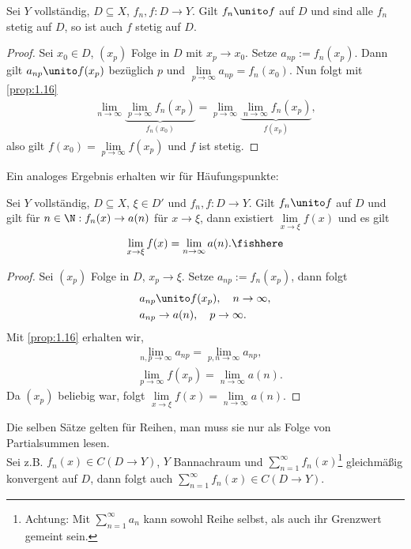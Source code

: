 \begin{prop}
\label{prop:1.21}
Sei $Y$ vollständig, $D\subseteq X$, $f_n,f: D\to Y$. Gilt $f_n\unito f$ auf
$D$ und sind alle $f_n$ stetig auf $D$, so ist auch $f$ stetig auf $D$.\fishhere
\end{prop}
\begin{proof}
Sei $x_0\in D$, $(x_p)$ Folge in $D$ mit $x_p\to x_0$. Setze $a_{np} :=
f_n(x_p)$. Dann gilt $a_{np} \unito f(x_p)$ bezüglich $p$ und
$\lim\limits_{p\to\infty} a_{np} = f_n(x_0)$. Nun folgt mit \ref{prop:1.16}
\begin{align*}
\lim\limits_{n\to\infty} \underbrace{\lim\limits_{p\to\infty}
f_n(x_p)}_{f_n(x_0)} =
\lim\limits_{p\to\infty}\underbrace{\lim\limits_{n\to\infty} f_n(x_p)}_{f(x_p)},
\end{align*}
also gilt $f(x_0) = \lim\limits_{p\to\infty} f(x_p)$ und $f$ ist stetig.\qedhere
\end{proof}
Ein analoges Ergebnis erhalten wir für Häufungspunkte:
\begin{prop}
\label{prop:1.22}
Sei $Y$ vollständig, $D\subseteq X$, $\xi\in D'$ und $f_n,f: D\to Y$. Gilt
$f_n\unito f$ auf $D$ und gilt für $n\in\N : f_n(x) \to a(n)$ für $x\to\xi$,
dann existiert $\lim\limits_{x\to\xi} f(x)$ und es gilt
\begin{align*}
\lim\limits_{x\to\xi} f(x) = \lim\limits_{n\to\infty} a(n).\fishhere
\end{align*}
\end{prop}
\begin{proof}
Sei $(x_p)$ Folge in $D$, $x_p\to\xi$. Setze $a_{np}:=f_n(x_p)$, dann folgt
\begin{align*}
&a_{np}\unito f(x_p),\quad n\to \infty,\\
&a_{np} \to a(n),\quad p\to\infty.
\end{align*}
Mit \ref{prop:1.16} erhalten wir,
\begin{align*}
&\lim\limits_{n,p\to\infty} a_{np} = \lim\limits_{p,n\to \infty} a_{np},\\
&\lim\limits_{p\to\infty} f(x_p) = \lim\limits_{n\to\infty} a(n).
\end{align*}
Da $(x_p)$ beliebig war, folgt $\lim\limits_{x\to\xi} f(x) =
\lim\limits_{n\to\infty} a(n)$.\qedhere
\end{proof}

\begin{bem}
\label{bem:1.23}
Die selben Sätze gelten für Reihen, man muss sie nur als Folge von
Partialsummen lesen.\\
Sei z.B. $f_n(x)\in C(D\to Y)$, $Y$ Bannachraum und $\sum\limits_{n=1}^\infty
f_n(x)$\footnote{Achtung: Mit $\sum\limits_{n=1}^\infty a_n$ kann sowohl
Reihe selbst, als auch ihr Grenzwert gemeint sein.} gleichmäßig konvergent auf $D$, dann folgt auch
$\sum\limits_{n=1}^\infty f_n(x) \in C(D\to Y)$.\maphere
\end{bem}

